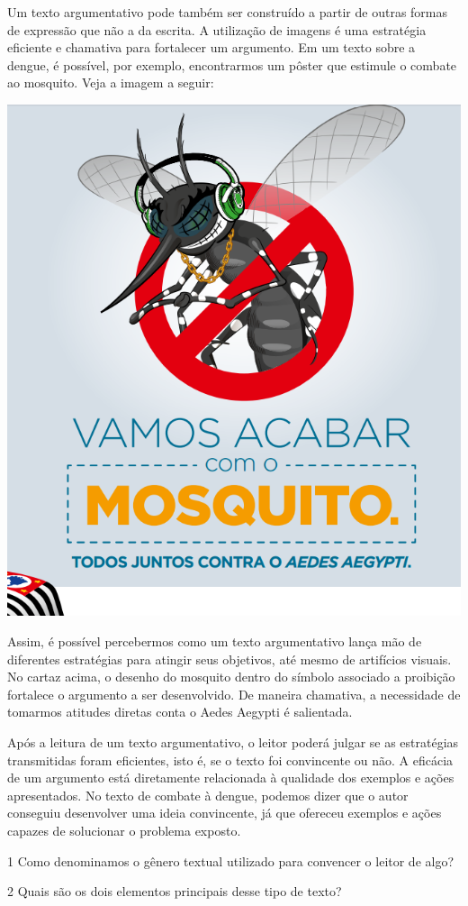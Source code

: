 {Um texto argumentativo pode também ser construído a partir de outras
formas de expressão que não a da escrita. A utilização de imagens é uma
estratégia eficiente e chamativa para fortalecer um argumento. Em um
texto sobre a dengue, é possível, por exemplo, encontrarmos um pôster
que estimule o combate ao mosquito. Veja a imagem a seguir:

\includegraphics[width=.5\textwidth]{./imgs/img11.jpg}

Assim, é possível percebermos como um texto argumentativo lança mão de
diferentes estratégias para atingir seus objetivos, até mesmo de
artifícios visuais. No cartaz acima, o desenho do mosquito dentro do
símbolo associado a proibição fortalece o argumento a ser desenvolvido.
De maneira chamativa, a necessidade de tomarmos atitudes diretas conta o
Aedes Aegypti é salientada.

Após a leitura de um texto argumentativo, o leitor poderá julgar se as
estratégias transmitidas foram eficientes, isto é, se o texto foi
convincente ou não. A eficácia de um argumento está diretamente
relacionada à qualidade dos exemplos e ações apresentados. No texto de
combate à dengue, podemos dizer que o autor conseguiu desenvolver uma
ideia convincente, já que ofereceu exemplos e ações capazes de
solucionar o problema exposto.}


\num{1} Como denominamos o gênero textual utilizado para convencer o leitor
de algo?



\num{2} Quais são os dois elementos principais desse tipo de texto?



